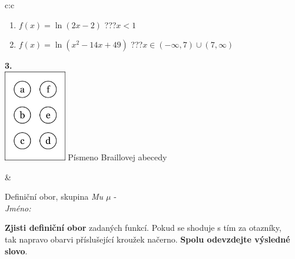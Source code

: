 \documentclass[10pt]{report}
\begin{document}
\begin{tabular}{c:c}
\begin{minipage}[c][104.5mm][t]{0.5\linewidth}
\begin{center}
\begin{minipage}{0.79\linewidth}
\begin{center}
\begin{varwidth}{\linewidth}
\begin{enumerate}
\item $f(x)=\ln{(2x-2)}$\quad \dotfill\; ???\;\dotfill \quad $x<1$
\item $f(x)=\ln{(x^2-14x+49)}$\quad \dotfill\; ???\;\dotfill \quad $x\in(-\infty , 7)\cup(7 , \infty)$
\end{enumerate}
\end{varwidth}
\end{center}
\end{minipage}
\begin{minipage}{0.20\linewidth}
\begin{center}
{\Huge\bfseries 3.} \\[2mm]
\includegraphics[height=40mm]{../images/braille.png}
{\small Písmeno Braillovej abecedy}
\end{center}
\end{minipage}
\end{center}
\end{minipage}
&
\begin{minipage}[c][104.5mm][t]{0.5\linewidth}
\begin{center}
\vspace{7mm}
{\huge Definiční obor, skupina \textit{Mu $\mu$} -}\\[5mm]
\textit{Jméno:}\phantom{xxxxxxxxxxxxxxxxxxxxxxxxxxxxxxxxxxxxxxxxxxxxxxxxxxxxxxxxxxxxxxxxx}\\[5mm]
\begin{minipage}{0.95\linewidth}
\begin{center}
\textbf{Zjisti definiční obor} zadaných funkcí. Pokud se shoduje s tím za otazníky,\\tak napravo obarvi příslušející kroužek načerno. \textbf{Spolu odevzdejte výsledné slovo}.
\end{center}
\end{minipage}
\\[1mm]
\begin{minipage}{0.79\linewidth}
\begin{center}
\begin{varwidth}{\linewidth}
\begin{enumerate}
\normalsizerrr

\end{enumerate}
\end{varwidth}
\end{center}
\end{minipage}
\end{center}
\end{minipage}
\end{tabular}
\end{document}

